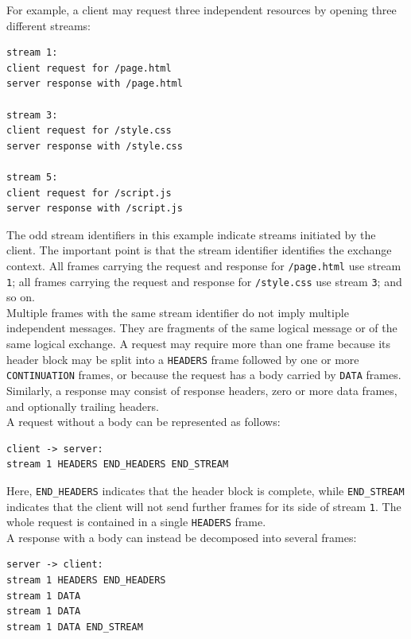 \documentclass{scrbook}
\begin{document}
For example, a client may request three independent resources by opening three different streams:

\begin{lstlisting}
stream 1:
client request for /page.html
server response with /page.html

stream 3:
client request for /style.css
server response with /style.css

stream 5:
client request for /script.js
server response with /script.js
\end{lstlisting}

The odd stream identifiers in this example indicate streams initiated by the client. The important point is that the stream identifier identifies the exchange context. All frames carrying the request and response for \texttt{/page.html} use stream \texttt{1}; all frames carrying the request and response for \texttt{/style.css} use stream \texttt{3}; and so on.\\

Multiple frames with the same stream identifier do not imply multiple independent messages. They are fragments of the same logical message or of the same logical exchange. A request may require more than one frame because its header block may be split into a \texttt{HEADERS} frame followed by one or more \texttt{CONTINUATION} frames, or because the request has a body carried by \texttt{DATA} frames. Similarly, a response may consist of response headers, zero or more data frames, and optionally trailing headers.\\

A request without a body can be represented as follows:

\begin{lstlisting}
client -> server:
stream 1 HEADERS END_HEADERS END_STREAM
\end{lstlisting}

Here, \texttt{END\_HEADERS} indicates that the header block is complete, while \texttt{END\_STREAM} indicates that the client will not send further frames for its side of stream \texttt{1}. The whole request is contained in a single \texttt{HEADERS} frame.\\

A response with a body can instead be decomposed into several frames:

\begin{lstlisting}
server -> client:
stream 1 HEADERS END_HEADERS
stream 1 DATA
stream 1 DATA
stream 1 DATA END_STREAM
\end{lstlisting}
\end{document}
